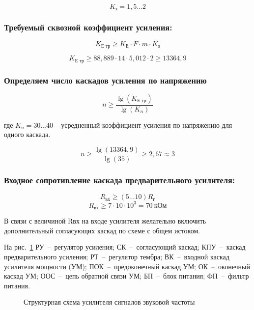 \begin{equation*}
  K_{\text{з}} = 1,5 \ldots 2 
\end{equation*}
  
\subsubsection{Требуемый сквозной коэффициент усиления:}

\begin{equation}
  \label{eq:equation1_4}
  K_{\text{Е тр}} \geq K_{\text{Е}} \cdot F \cdot m \cdot K_{\text{з}}
\end{equation}

\begin{equation*}
  K_{\text{Е тр}} \geq 88,889 \cdot 14 \cdot 5,012 \cdot 2 \geq 13364,9
\end{equation*}
    
\subsubsection{Определяем число каскадов усиления по напряжению}


\begin{equation}
  \label{eq:equation1_5}
  n \geq \dfrac{\lg(K_{\text{Е тр}})}{\lg(K_n)}
\end{equation}

\noindent где $ K_n = 30 \ldots 40 $ -- усредненный коэффициент усиления по напряжению для одного каскада.\par	

 \begin{equation*}
   n \geq \dfrac{\lg( 13364,9 )}{\lg( 35 )} \geq 2,67 \approx 3
\end{equation*} 

\subsubsection{Входное сопротивление каскада предварительного усилителя:}


\begin{equation}
  \label{eq:equation1_6}
  R_{\text{вх}} \geq (5 \ldots 10) R_{\text{г}}
\end{equation}
\begin{equation*}
   R_{\text{вх}} \geq 7 \cdot 10\cdot 10^3 = 70 ~\text{кОм}
\end{equation*}   

В связи с величиной  Rвх на входе усилителя желательно включить дополнительный согласующих  каскад по схеме с общем истоком. \par 
На рис.~\ref{figure:p1_2} РУ~--~регулятор усиления; СК~--~согласующий каскад; КПУ~--~каскад предварительного усиления; РТ~--~регулятор тембра; ВК~--~входной каскад усилителя мощности (УМ); ПОК~--~предоконечный каскад УМ; ОК~--~оконечный каскад УМ; ООС~--~цепь обратной связи УМ; БП~--~блок питания; ФП~--~фильтр питания.
\clearpage
\begin{figure}[htbp]
    \caption{Структурная схема усилителя сигналов звуковой частоты}
    \label{figure:p1_2}
  \end{figure}
  
  
